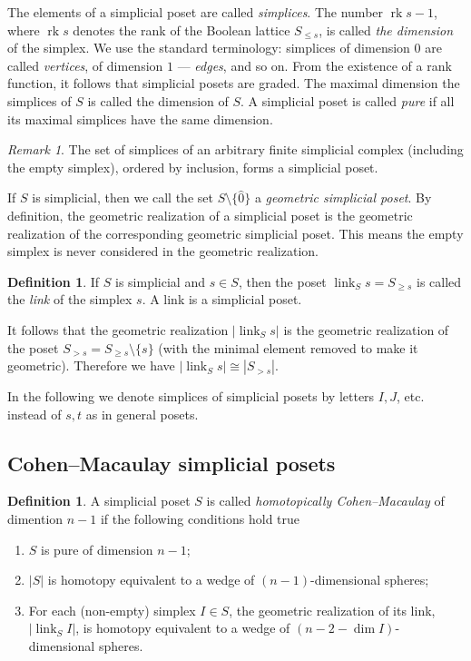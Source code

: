 \documentclass[english,12pt,oneside]{amsproc}
\DeclareMathOperator{\rk}{rk}
\DeclareMathOperator{\link}{link}
\newcounter{stmcounter}[section]
\numberwithin{equation}{section}
\theoremstyle{plain}
\theoremstyle{definition}
\newtheorem{defin}[stmcounter]{Definition}
\theoremstyle{remark}
\newtheorem{rem}[stmcounter]{Remark}
\begin{document}
The elements of a simplicial poset are called \emph{simplices}. The number $\rk s-1$, where $\rk s$ denotes the rank of the Boolean lattice $S_{\leqslant s}$, is called \emph{the dimension} of the simplex. We use the standard terminology: simplices of dimension $0$ are called \emph{vertices}, of dimension $1$ --- \emph{edges},  and  so on. From the existence of a rank function, it follows that simplicial posets are graded. The maximal dimension the simplices of $S$ is called the dimension of $S$. A simplicial poset is called \emph{pure} if all its maximal simplices have the same dimension.

\begin{rem}\label{remSimpPosetFromComplex}
The set of simplices of an arbitrary finite simplicial complex (including the empty simplex), ordered by inclusion, forms a simplicial poset.
\end{rem}

If $S$ is simplicial, then we call the set $S\setminus\{\hat{0}\}$ a \emph{geometric simplicial poset}. By definition, the geometric realization of a simplicial poset is the geometric realization of the corresponding geometric simplicial poset. This means the empty simplex is never considered in the geometric realization.

\begin{defin}
If $S$ is simplicial and  $s\in S$, then the poset $\link_Ss=S_{\geqslant s}$ is called the \emph{link} of the simplex $s$. A link is a simplicial poset.
\end{defin}

It follows that the geometric realization $|\link_Ss|$ is the geometric realization of the poset $S_{>s}=S_{\geqslant s}\setminus \{s\}$ (with the minimal element removed to make it geometric). Therefore we have $|\link_Ss|\cong |S_{>s}|$.

In the following we denote simplices of simplicial posets by letters $I,J$, etc. instead of $s,t$ as in general posets.

\subsection{Cohen--Macaulay simplicial posets}\label{subsecCMposets}

\begin{defin}
A simplicial poset $S$ is called \emph{homotopically Cohen–Macaulay} of dimention $n-1$ if the following conditions hold true
\begin{enumerate}
  \item $S$ is pure of dimension $n-1$;
  \item $|S|$ is homotopy equivalent to a wedge of $(n-1)$-dimensional spheres;
  \item For each (non-empty) simplex $I\in S$,  the geometric realization of its link, $|\link_SI|$, is homotopy equivalent to a wedge of $(n-2-\dim I)$-dimensional spheres.
\end{enumerate}
\end{defin}
\end{document}
